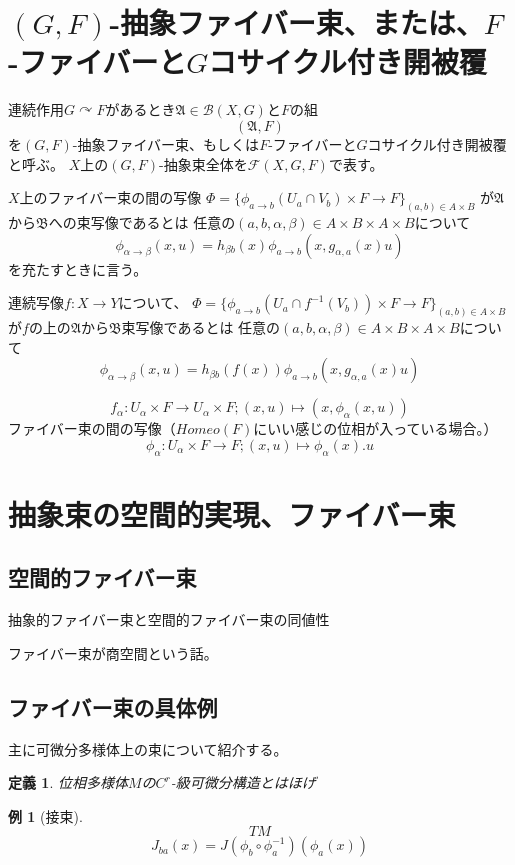 \documentclass[leqno]{jsarticle}
\newtheorem{df}[thm]{定義}
\newtheorem{exam}[thm]{例}
\newcommand{\al}{\alpha}
\begin{document}
\section{$(G,F)$-抽象ファイバー束、または、$F$-ファイバーと$G$コサイクル付き開被覆}
連続作用$G\curvearrowright F$があるとき$\mathfrak{A}\in \mathscr{B}(X,G)$と$F$の組
\[
(\mathfrak{A}, F)
\]
を$(G,F)$-抽象ファイバー束、もしくは$F$-ファイバーと$G$コサイクル付き開被覆と呼ぶ。
$X$上の$(G,F)$-抽象束全体を$\mathscr{F}(X,G,F)$で表す。

$X$上のファイバー束の間の写像
$\Phi=\{\phi_{a\to b}(U_a\cap V_b)\times F\to F\}_{(a,b)\in A\times B}$
が$\mathfrak{A}$から$\mathfrak{B}$への束写像であるとは
任意の$(a,b,\alpha, \beta)\in A\times B\times A\times B$について
\[
\phi_{\alpha\to \beta}(x,u)=h_{\beta b}(x)\phi_{a\to b}(x, g_{\alpha, a }(x)u)
\]
を充たすときに言う。

連続写像$f:X\to Y$について、
$\Phi=\{\phi_{a\to b}(U_a\cap f^{-1}(V_b))\times F\to F\}_{(a,b)\in A\times B}$
が$f$の上の$\mathfrak{A}$から$\mathfrak{B}$束写像であるとは
任意の$(a,b,\alpha, \beta)\in A\times B\times A\times B$について
\[
\phi_{\alpha\to \beta}(x,u)=h_{\beta b}(f(x))\phi_{a\to b}(x, g_{\alpha, a }(x)u)
\]



\[
f_{\al}: U_{\al}\times F\to U_{\al}\times F; (x, u)\mapsto (x, \phi_{\al}(x,u))
\]
ファイバー束の間の写像（$Homeo(F)$にいい感じの位相が入っている場合。）
\[
\phi_{\al}:U_{\al}\times F\to F; (x,u)\mapsto \phi_{\al}(x).u
\]



\section{抽象束の空間的実現、ファイバー束}

\subsection{空間的ファイバー束}

抽象的ファイバー束と空間的ファイバー束の同値性





ファイバー束が商空間という話。


\subsection{ファイバー束の具体例}
主に可微分多様体上の束について紹介する。
\begin{df}
位相多様体$M$の$C^r$-級可微分構造とはほげ
\end{df}
\begin{exam}[接束]
\[
TM
\]
\[
J_{ba}(x)=J(\phi_{b}\circ \phi_{a}^{-1})(\phi_a(x))
\]
\end{exam}
\end{document}
